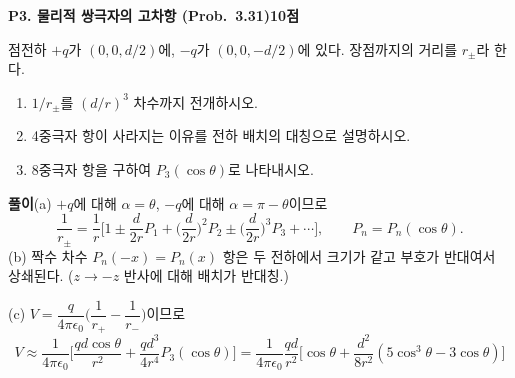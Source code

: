 \documentclass[10pt,a4paper]{article}
\newcommand{\problem}[3]{%
  \needspace{0.18\textheight}
  \par\vspace{2.2mm}
  {\large\bfseries\color{navy}#1\hfill{\normalsize\color{blue}#2점}}\par
  \smallskip #3\par
}
\newcommand{\answer}[1]{\par\begin{tcolorbox}[colback=white,colframe=hair,boxrule=0.5pt,arc=0pt,left=3mm,right=3mm,top=1.5mm,bottom=1.5mm]{\color{blue}\bfseries 풀이}\quad #1\end{tcolorbox}}
\begin{document}
\problem{P3. 물리적 쌍극자의 고차항 (Prob.~3.31)}{10}{%

점전하 $+q$가 $(0,0,d/2)$에, $-q$가 $(0,0,-d/2)$에 있다. 장점까지의 거리를 $r_\pm$라 한다.
\begin{enumerate}[label=(\alph*)]
  \item $1/r_\pm$를 $(d/r)^3$ 차수까지 전개하시오.
  \item 4중극자 항이 사라지는 이유를 전하 배치의 대칭으로 설명하시오.
  \item 8중극자 항을 구하여 $P_3(\cos\theta)$로 나타내시오.
\end{enumerate}
\answer{(a) $+q$에 대해 $\alpha=\theta$, $-q$에 대해 $\alpha=\pi-\theta$이므로
\[
\frac{1}{r_\pm}=\frac1r\Big[1\pm\frac{d}{2r}P_1+\Big(\frac{d}{2r}\Big)^2P_2\pm\Big(\frac{d}{2r}\Big)^3P_3+\cdots\Big],\qquad P_n=P_n(\cos\theta).
\]
(b) 짝수 차수 $P_n(-x)=P_n(x)$ 항은 두 전하에서 크기가 같고 부호가 반대여서 상쇄된다. ($z\to-z$ 반사에 대해 배치가 반대칭.)

(c) $V=\dfrac{q}{4\pi\epsilon_0}\Big(\dfrac1{r_+}-\dfrac1{r_-}\Big)$이므로
\[
\boxed{V\approx\frac{1}{4\pi\epsilon_0}\Big[\frac{qd\cos\theta}{r^2}+\frac{qd^3}{4r^4}P_3(\cos\theta)\Big]
=\frac{1}{4\pi\epsilon_0}\frac{qd}{r^2}\Big[\cos\theta+\frac{d^2}{8r^2}(5\cos^3\theta-3\cos\theta)\Big]}
\]}}
\end{document}
